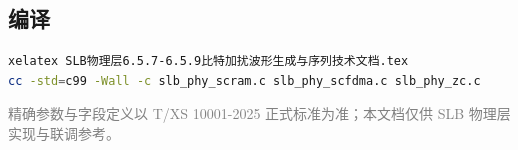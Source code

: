 \documentclass[11pt,a4paper]{ctexart}
\begin{document}
\subsection{编译}

\begin{lstlisting}[language=bash]
xelatex SLB物理层6.5.7-6.5.9比特加扰波形生成与序列技术文档.tex
cc -std=c99 -Wall -c slb_phy_scram.c slb_phy_scfdma.c slb_phy_zc.c
\end{lstlisting}

\vfill
\begin{center}
\small\textcolor{gray}{精确参数与字段定义以 T/XS 10001-2025 正式标准为准；本文档仅供 SLB 物理层实现与联调参考。}
\end{center}
\end{document}
